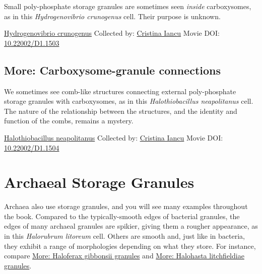 \documentclass[]{tufte-book}
\begin{document}
Small poly-phosphate storage granules are sometimes seen \emph{inside} carboxysomes, as in this \emph{Hydrogenovibrio crunogenus} cell. Their purpose is unknown.



\hypertarget{htmlwidget-a86f6ad120f017ba0ff3}{}

\label{fig:4-9a}\protect\hyperlink{tree}{Hydrogenovibrio crunogenus} Collected by: \protect\hyperlink{cristina_iancu}{Cristina Iancu} Movie DOI: \href{https://doi.org/10.22002/D1.1503}{10.22002/D1.1503}

\hypertarget{Carboxysome-granule_connections}{%
\subsection*{More: Carboxysome-granule connections}\label{Carboxysome-granule_connections}}

We sometimes see comb-like structures connecting external poly-phosphate storage granules with carboxysomes, as in this \emph{Halothiobacillus neapolitanus} cell. The nature of the relationship between the structures, and the identity and function of the combs, remains a mystery.



\hypertarget{htmlwidget-aab83502b90b60a2eb3f}{}

\label{fig:4-9b}\protect\hyperlink{tree}{Halothiobacillus neapolitanus} Collected by: \protect\hyperlink{cristina_iancu}{Cristina Iancu} Movie DOI: \href{https://doi.org/10.22002/D1.1504}{10.22002/D1.1504}

\hypertarget{archaeal-storage-granules}{%
\section{Archaeal Storage Granules}\label{archaeal-storage-granules}}

Archaea also use storage granules, and you will see many examples throughout the book. Compared to the typically-smooth edges of bacterial granules, the edges of many archaeal granules are spikier, giving them a rougher appearance, as in this \emph{Halorubrum litoreum} cell. Others are smooth and, just like in bacteria, they exhibit a range of morphologies depending on what they store. For instance, compare \protect\hyperlink{Haloferax_gibbonsii_granules}{More: Haloferax gibbonsii granules} and \protect\hyperlink{Halohasta_litchfieldiae_granules}{More: Halohasta litchfieldiae granules}.
\end{document}
